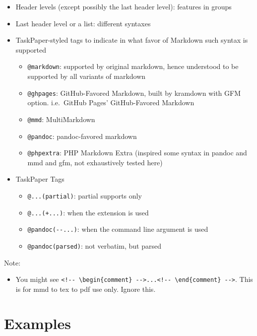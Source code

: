 \documentclass[]{article}
\providecommand{\tightlist}{%
  \setlength{\itemsep}{0pt}\setlength{\parskip}{0pt}}
\begin{document}
\begin{itemize}
\tightlist
\item
  Header levels (except possibly the last header level): features in
  groups
\item
  Last header level or a list: different syntaxes
\item
  TaskPaper-styled tags to indicate in what favor of Markdown such
  syntax is supported

  \begin{itemize}
  \tightlist
  \item
    \texttt{@markdown}: supported by original markdown, hence understood
    to be supported by all variants of markdown
  \item
    \texttt{@ghpages}: GitHub-Favored Markdown, built by kramdown with
    GFM option. i.e.~GitHub Pages' GitHub-Favored Markdown
  \item
    \texttt{@mmd}: MultiMarkdown~
  \item
    \texttt{@pandoc}: pandoc-favored markdown
  \item
    \texttt{@phpextra}: PHP Markdown Extra (inspired some syntax in
    pandoc and mmd and gfm, not exhaustively tested here)
  \end{itemize}
\item
  TaskPaper Tags

  \begin{itemize}
  \tightlist
  \item
    \texttt{@...(partial)}: partial supports only
  \item
    \texttt{@...(+...)}: when the extension is used
  \item
    \texttt{@pandoc(-\/-...)}: when the command line argument is used
  \item
    \texttt{@pandoc(parsed)}: not verbatim, but parsed
  \end{itemize}
\end{itemize}

Note:

\begin{itemize}
\tightlist
\item
  You might see
  \texttt{\textless{}!-\/-\ \textbackslash{}begin\{comment\}\ -\/-\textgreater{}...\textless{}!-\/-\ \textbackslash{}end\{comment\}\ -\/-\textgreater{}}.
  This is for mmd to tex to pdf use only. Ignore this.
\end{itemize}

\hypertarget{examples}{\section{Examples}\label{examples}}
\end{document}
